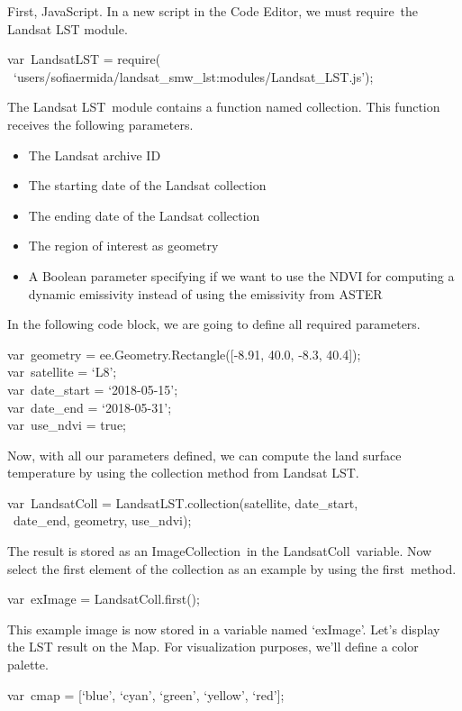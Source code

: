 \documentclass[
  letterpaper,
  DIV=11,
  numbers=noendperiod]{scrreprt}
\providecommand{\tightlist}{%
  \setlength{\itemsep}{0pt}\setlength{\parskip}{0pt}}\usepackage{longtable,booktabs,array}
\begin{document}
First, JavaScript. In a new script in the Code Editor, we must
require~the Landsat LST module.

var~LandsatLST = require(~
~`users/sofiaermida/landsat\_smw\_lst:modules/Landsat\_LST.js');

The Landsat LST~module contains a function named collection. This
function receives the following parameters.

\begin{itemize}
\tightlist
\item
  The Landsat archive ID
\item
  The starting date of the Landsat collection
\item
  The ending date of the Landsat collection
\item
  The region of interest as geometry
\item
  A Boolean parameter specifying if we want to use the NDVI for
  computing a dynamic emissivity instead of using the emissivity from
  ASTER
\end{itemize}

In the following code block, we are going to define all required
parameters.

var~geometry = ee.Geometry.Rectangle({[}-8.91, 40.0, -8.3, 40.4{]});\\
var~satellite = `L8';\\
var~date\_start = `2018-05-15';\\
var~date\_end = `2018-05-31';\\
var~use\_ndvi = true;

Now, with all our parameters defined, we can compute the land surface
temperature by using the collection method from Landsat LST.

var~LandsatColl = LandsatLST.collection(satellite, date\_start,\\
\hspace*{0.333em} ~date\_end, geometry, use\_ndvi);

The result is stored as an ImageCollection~in the LandsatColl~variable.
Now select the first element of the collection as an example by using
the first~method.

var~exImage = LandsatColl.first();

This example image is now stored in a variable named `exImage'. Let's
display the LST result on the Map. For visualization purposes, we'll
define a color palette.

var~cmap = {[}`blue', `cyan', `green', `yellow', `red'{]};
\end{document}
